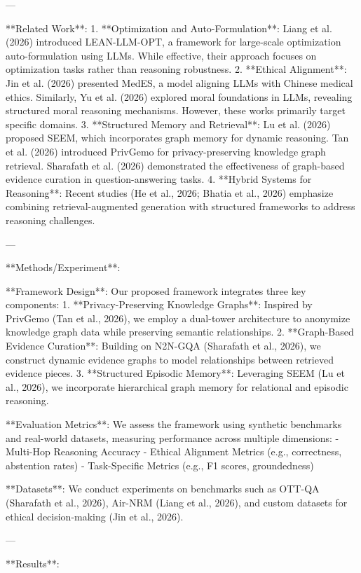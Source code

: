 ---

**Related Work**:  
1. **Optimization and Auto-Formulation**: Liang et al. (2026) introduced LEAN-LLM-OPT, a framework for large-scale optimization auto-formulation using LLMs. While effective, their approach focuses on optimization tasks rather than reasoning robustness.  
2. **Ethical Alignment**: Jin et al. (2026) presented MedES, a model aligning LLMs with Chinese medical ethics. Similarly, Yu et al. (2026) explored moral foundations in LLMs, revealing structured moral reasoning mechanisms. However, these works primarily target specific domains.  
3. **Structured Memory and Retrieval**: Lu et al. (2026) proposed SEEM, which incorporates graph memory for dynamic reasoning. Tan et al. (2026) introduced PrivGemo for privacy-preserving knowledge graph retrieval. Sharafath et al. (2026) demonstrated the effectiveness of graph-based evidence curation in question-answering tasks.  
4. **Hybrid Systems for Reasoning**: Recent studies (He et al., 2026; Bhatia et al., 2026) emphasize combining retrieval-augmented generation with structured frameworks to address reasoning challenges.  

---

**Methods/Experiment**:  

**Framework Design**:  
Our proposed framework integrates three key components:  
1. **Privacy-Preserving Knowledge Graphs**: Inspired by PrivGemo (Tan et al., 2026), we employ a dual-tower architecture to anonymize knowledge graph data while preserving semantic relationships.  
2. **Graph-Based Evidence Curation**: Building on N2N-GQA (Sharafath et al., 2026), we construct dynamic evidence graphs to model relationships between retrieved evidence pieces.  
3. **Structured Episodic Memory**: Leveraging SEEM (Lu et al., 2026), we incorporate hierarchical graph memory for relational and episodic reasoning.  

**Evaluation Metrics**:  
We assess the framework using synthetic benchmarks and real-world datasets, measuring performance across multiple dimensions:  
- Multi-Hop Reasoning Accuracy  
- Ethical Alignment Metrics (e.g., correctness, abstention rates)  
- Task-Specific Metrics (e.g., F1 scores, groundedness)  

**Datasets**:  
We conduct experiments on benchmarks such as OTT-QA (Sharafath et al., 2026), Air-NRM (Liang et al., 2026), and custom datasets for ethical decision-making (Jin et al., 2026).  

---

**Results**:  

